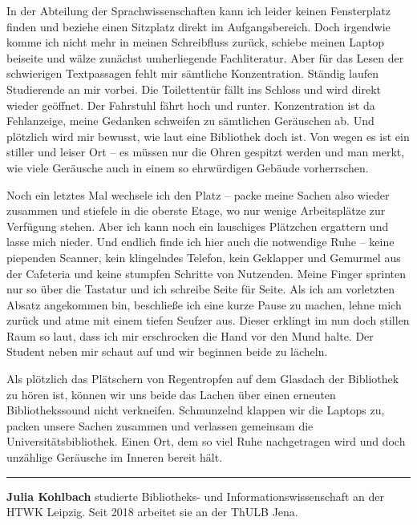 \documentclass[a4paper,
fontsize=11pt,
oneside,
numbers=noperiodatend,
parskip=half-,
bibliography=totoc,
final
]{scrartcl}
\begin{document}
In der Abteilung der Sprachwissenschaften kann ich leider keinen
Fensterplatz finden und beziehe einen Sitzplatz direkt im
Aufgangsbereich. Doch irgendwie komme ich nicht mehr in meinen
Schreibfluss zurück, schiebe meinen Laptop beiseite und wälze zunächst
umherliegende Fachliteratur. Aber für das Lesen der schwierigen
Textpassagen fehlt mir sämtliche Konzentration. Ständig laufen
Studierende an mir vorbei. Die Toilettentür fällt ins Schloss und wird
direkt wieder geöffnet. Der Fahrstuhl fährt hoch und runter.
Konzentration ist da Fehlanzeige, meine Gedanken schweifen zu sämtlichen
Geräuschen ab. Und plötzlich wird mir bewusst, wie laut eine Bibliothek
doch ist. Von wegen es ist ein stiller und leiser Ort -- es müssen nur
die Ohren gespitzt werden und man merkt, wie viele Geräusche auch in
einem so ehrwürdigen Gebäude vorherrschen.

Noch ein letztes Mal wechsele ich den Platz -- packe meine Sachen also
wieder zusammen und stiefele in die oberste Etage, wo nur wenige
Arbeitsplätze zur Verfügung stehen. Aber ich kann noch ein lauschiges
Plätzchen ergattern und lasse mich nieder. Und endlich finde ich hier
auch die notwendige Ruhe -- keine piependen Scanner, kein klingelndes
Telefon, kein Geklapper und Gemurmel aus der Cafeteria und keine
stumpfen Schritte von Nutzenden. Meine Finger sprinten nur so über die
Tastatur und ich schreibe Seite für Seite. Als ich am vorletzten Absatz
angekommen bin, beschließe ich eine kurze Pause zu machen, lehne mich
zurück und atme mit einem tiefen Seufzer aus. Dieser erklingt im nun
doch stillen Raum so laut, dass ich mir erschrocken die Hand vor den
Mund halte. Der Student neben mir schaut auf und wir beginnen beide zu
lächeln.

Als plötzlich das Plätschern von Regentropfen auf dem Glasdach der
Bibliothek zu hören ist, können wir uns beide das Lachen über einen
erneuten Bibliothekssound nicht verkneifen. Schmunzelnd klappen wir die
Laptops zu, packen unsere Sachen zusammen und verlassen gemeinsam die
Universitätsbibliothek. Einen Ort, dem so viel Ruhe nachgetragen wird
und doch unzählige Geräusche im Inneren bereit hält.

\begin{center}\rule{0.5\linewidth}{0.5pt}\end{center}

\textbf{Julia Kohlbach} studierte Bibliotheks- und
Informationswissenschaft an der HTWK Leipzig. Seit 2018 arbeitet sie an
der ThULB Jena.
\end{document}
